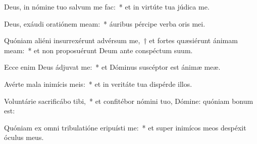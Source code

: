 \item Deus, in nómine tuo salvum me fac:~* et in virtúte tua júdica me.

\item Deus, exáudi oratiónem meam:~* áuribus pércipe verba oris mei.

\item Quóniam aliéni insurrexérunt advérsum me,~† et fortes quæsiérunt ánimam meam:~* et non proposuérunt Deum ante conspéctum suum.

\item Ecce enim Deus ádjuvat me:~* et Dóminus suscéptor est ánimæ meæ.

\item Avérte mala inimícis meis:~* et in veritáte tua dispérde illos.

\item Voluntárie sacrificábo tibi,~* et confitébor nómini tuo, Dómine: quóniam bonum est:

\item Quóniam ex omni tribulatióne eripuísti me:~* et super inimícos meos despéxit óculus meus.

